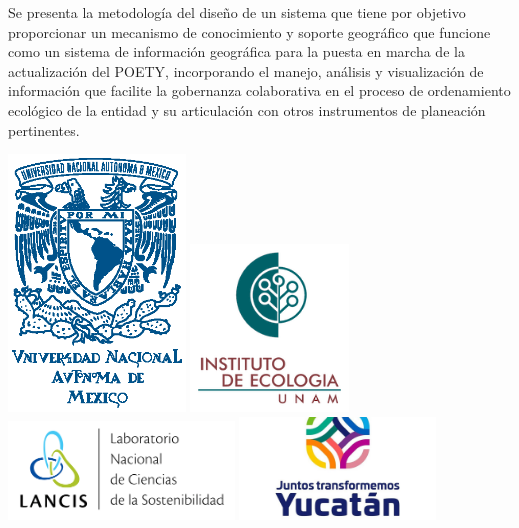 \begin{titlepage}
\begin{minipage}[t]{0.6\textwidth}
Se presenta la metodología del diseño de un sistema que tiene por objetivo proporcionar un mecanismo de conocimiento y soporte geográfico que funcione como un sistema de información geográfica para la puesta en marcha de la actualización del POETY, incorporando el manejo, análisis y visualización de información que facilite la gobernanza colaborativa en el proceso de ordenamiento ecológico de la entidad y su articulación con otros instrumentos de planeación pertinentes.
\end{minipage}%
\hfill
\begin{minipage}[t]{0.25\textwidth} 
  \includegraphics[width=47mm]{images/UNAM}\vspace{2cm}
  \includegraphics[width=42mm]{images/ie_logo}\vspace{2cm}
  \includegraphics[width=60mm]{images/lancis_logo}\vspace{2cm}
  \includegraphics[width=52mm]{images/yucatan_logo}%
\end{minipage}

\end{titlepage}

\pagebreak

\restoregeometry